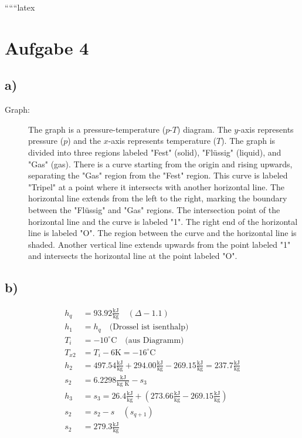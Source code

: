 
``````latex


\section*{Aufgabe 4}

\subsection*{a)}

\begin{description}
    \item[Graph:] The graph is a pressure-temperature ($p$-$T$) diagram. The $y$-axis represents pressure ($p$) and the $x$-axis represents temperature ($T$). The graph is divided into three regions labeled "Fest" (solid), "Flüssig" (liquid), and "Gas" (gas). There is a curve starting from the origin and rising upwards, separating the "Gas" region from the "Fest" region. This curve is labeled "Tripel" at a point where it intersects with another horizontal line. The horizontal line extends from the left to the right, marking the boundary between the "Flüssig" and "Gas" regions. The intersection point of the horizontal line and the curve is labeled "1". The right end of the horizontal line is labeled "O". The region between the curve and the horizontal line is shaded. Another vertical line extends upwards from the point labeled "1" and intersects the horizontal line at the point labeled "O".
\end{description}

\subsection*{b)}

\begin{align*}
    h_q &= 93.92 \frac{\text{kJ}}{\text{kg}} \quad (\Delta - 1.1) \\
    h_1 &= h_q \quad \text{(Drossel ist isenthalp)} \\
    T_i &= -10^\circ \text{C} \quad \text{(aus Diagramm)} \\
    T_{x2} &= T_i - 6 \text{K} = -16^\circ \text{C} \\
    h_2 &= 497.54 \frac{\text{kJ}}{\text{kg}} + 294.00 \frac{\text{kJ}}{\text{kg}} - 269.15 \frac{\text{kJ}}{\text{kg}} = 237.7 \frac{\text{kJ}}{\text{kg}} \\
    s_2 &= 6.2298 \frac{\text{kJ}}{\text{kg K}} - s_3 \\
    h_3 &= s_3 = 26.4 \frac{\text{kJ}}{\text{kg}} + (273.66 \frac{\text{kJ}}{\text{kg}} - 269.15 \frac{\text{kJ}}{\text{kg}}) \\
    s_2 &= s_2 - s \quad (s_{q+1}) \\
    s_2 &= 279.3 \frac{\text{kJ}}{\text{kg}} \\
\end{align*}

